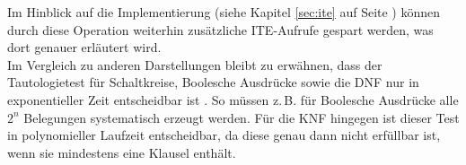 Im Hinblick auf die Implementierung (siehe Kapitel \ref{sec:ite} auf Seite \pageref{sec:ite}) können durch diese Operation weiterhin zusätzliche ITE-Aufrufe gespart werden, was dort genauer erläutert wird.\\
Im Vergleich zu anderen Darstellungen bleibt zu erwähnen, dass der Tautologietest für Schaltkreise, Boolesche Ausdrücke sowie die DNF nur in exponentieller Zeit entscheidbar ist \cite{m2007}. So müssen z.\,B. für Boolesche Ausdrücke alle $2^n$ Belegungen systematisch erzeugt werden. Für die KNF hingegen ist dieser Test in polynomieller Laufzeit entscheidbar, da diese genau dann nicht erfüllbar ist, wenn sie mindestens eine Klausel enthält.
